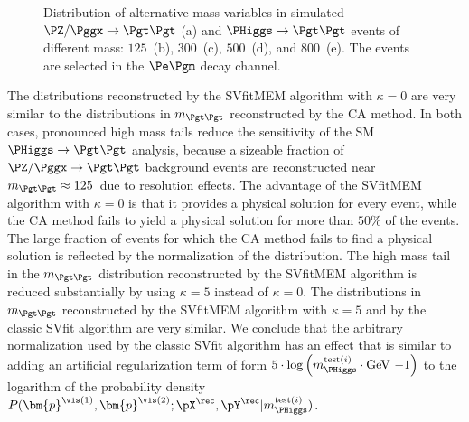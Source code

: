 \begin{figure}
\begin{center}
\end{center}
\caption{
  Distribution of alternative mass variables in simulated $\PZ/\Pggx \to \Pgt\Pgt$ (a) 
  and $\PHiggs \to \Pgt\Pgt$ events of different mass:
  $125$~\GeV (b), $300$~\GeV (c), $500$~\GeV (d), and $800$~\GeV (e).
  The events are selected in the $\Pe\Pgm$ decay channel.
}
\label{fig:massDistributions_emu}
\end{figure}

The distributions reconstructed by the SVfitMEM algorithm with $\kappa = 0$ are very similar to the distributions in $m_{\Pgt\Pgt}$ reconstructed by the CA method.
In both cases, pronounced high mass tails reduce the sensitivity of the SM $\PHiggs \to \Pgt\Pgt$ analysis,
because a sizeable fraction of $\PZ/\Pggx \to \Pgt\Pgt$ background events
are reconstructed near $m_{\Pgt\Pgt} \approx 125$~\GeV due to resolution effects.
The advantage of the SVfitMEM algorithm with $\kappa =
0$ is that it provides a physical solution for every event,
while the CA method fails to yield a physical solution for more than $50\%$ of the events.
The large fraction of events for which the CA method fails to find a physical solution is reflected by the normalization of the distribution.
The high mass tail in the $m_{\Pgt\Pgt}$ distribution reconstructed by
the SVfitMEM algorithm is reduced substantially by using
$\kappa = 5$ instead of $\kappa = 0$.
The distributions in $m_{\Pgt\Pgt}$ reconstructed by the SVfitMEM
algorithm with $\kappa = 5$ and by the classic SVfit algorithm are
very similar.
We conclude that the arbitrary normalization used by the classic SVfit
algorithm has an effect that is similar to adding 
an artificial regularization term of form $5 \cdot \log \left( m_{\PHiggs}^{\textrm{test}(i)} \cdot \mbox{GeV}~{-1} \right)$ to the logarithm of the probability
density $P(\bm{p}^{\vis(1)},\bm{p}^{\vis(2)};\pX^{\rec},\pY^{\rec}|m_{\PHiggs}^{\textrm{test}(i)})$.


